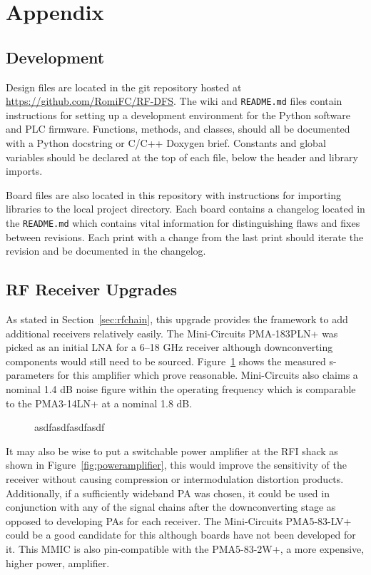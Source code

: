 \documentclass[titlepage]{article}
\begin{document}
\section{Appendix}
\subsection{Development}
Design files are located in the git repository hosted at \url{https://github.com/RomiFC/RF-DFS}. The wiki and \verb|README.md| files contain instructions for setting up a development environment for the Python software and PLC firmware. Functions, methods, and classes, should all be documented with a Python docstring or C/C++ Doxygen brief. Constants and global variables should be declared at the top of each file, below the header and library imports.

Board files are also located in this repository with instructions for importing libraries to the local project directory. Each board contains a changelog located in the \verb|README.md| which contains vital information for distinguishing flaws and fixes between revisions. Each print with a change from the last print should iterate the revision and be documented in the changelog.

\subsection{RF Receiver Upgrades}
As stated in Section~\ref{sec:rfchain}, this upgrade provides the framework to add additional receivers relatively easily. The Mini-Circuits PMA-183PLN+ was picked as an initial LNA for a 6--18 GHz receiver although downconverting components would still need to be sourced. Figure~\ref{fig:pma183} shows the measured s-parameters for this amplifier which prove reasonable. Mini-Circuits also claims a nominal 1.4 dB noise figure within the operating frequency which is comparable to the PMA3-14LN+ at a nominal 1.8 dB.
\begin{figure}[!ht]
  \begin{center}
    
  \end{center}
  \caption{asdfasdfasdfasdf}\label{fig:pma183}
\end{figure}

It may also be wise to put a switchable power amplifier at the RFI shack as shown in Figure~\ref{fig:poweramplifier}, this would improve the sensitivity of the receiver without causing compression or intermodulation distortion products. Additionally, if a sufficiently wideband PA was chosen, it could be used in conjunction with any of the signal chains after the downconverting stage as opposed to developing PAs for each receiver. The Mini-Circuits PMA5-83-LV+ could be a good candidate for this although boards have not been developed for it. This MMIC is also pin-compatible with the PMA5-83-2W+, a more expensive, higher power, amplifier.
\end{document}
